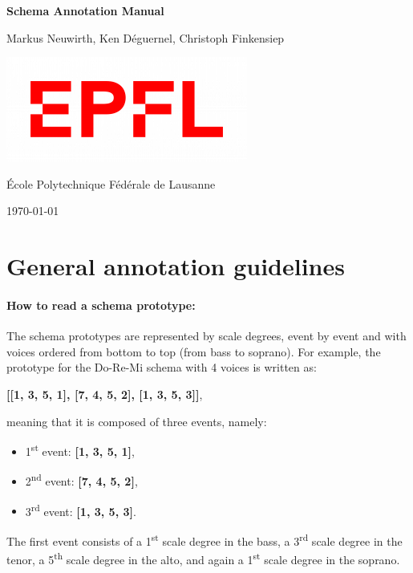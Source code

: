 \documentclass[11pt, openany]{article}
\begin{document}
\begin{titlepage}
	\clearpage\thispagestyle{empty}
	\centering
	
	\vspace*{3cm}
	{\Huge \textbf{Schema Annotation Manual}} \\
	\vspace{1cm}
	{\normalsize Markus Neuwirth, %
	             Ken D\'eguernel,
	             Christoph Finkensiep\par}
	\vspace{10cm}

    \includegraphics[scale=0.6]{EPFL_logo.png}
    
    
	{\normalsize \'Ecole Polytechnique F\'ed\'erale de Lausanne \par}
		
	{\normalsize \today \par}
	\vspace{2cm}
	
	\pagebreak
\end{titlepage}

\tableofcontents{}
\pagebreak


\section{General annotation guidelines}

\paragraph{How to read a schema prototype:\\}
The schema prototypes are represented by scale degrees, event by event and with voices ordered from bottom to top (from bass to soprano). For example, the prototype for the Do-Re-Mi schema with 4 voices is written as:
\begin{center}
\textbf{[[1, 3, 5, 1], [7, 4, 5, 2], [1, 3, 5, 3]]},
\end{center}
meaning that it is composed of three events, namely:
\begin{itemize}
\item 1\textsuperscript{st} event: \textbf{[1, 3, 5, 1]},
\item 2\textsuperscript{nd} event:\textbf{ [7, 4, 5, 2]},
\item 3\textsuperscript{rd} event: \textbf{[1, 3, 5, 3]}.
\end{itemize}
The first event consists of a 1\textsuperscript{st} scale degree in the bass, a 3\textsuperscript{rd} scale degree in the tenor, a 5\textsuperscript{th} scale degree in the alto, and again a 1\textsuperscript{st} scale degree in the soprano.\\
\end{document}
